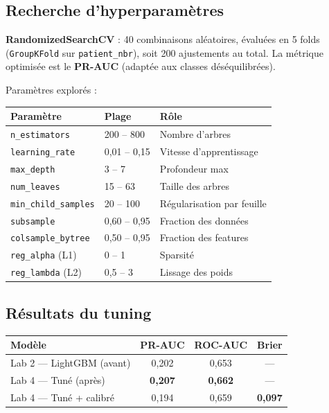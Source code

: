 \documentclass[11pt,a4paper]{article}
\begin{document}
\subsection{Recherche d'hyperparamètres}

\textbf{RandomizedSearchCV} : 40 combinaisons al\'eatoires, \'evalu\'ees en 5 folds (\texttt{GroupKFold} sur \texttt{patient\_nbr}), soit 200 ajustements au total. La m\'etrique optimis\'ee est le \textbf{PR-AUC} (adapt\'ee aux classes d\'es\'equilibr\'ees).

Param\`etres explor\'es :

\begin{center}
\small
\begin{tabular}{@{}lll@{}}
\toprule
\textbf{Param\`etre} & \textbf{Plage} & \textbf{R\^ole} \\
\midrule
\texttt{n\_estimators} & 200 -- 800 & Nombre d'arbres \\
\texttt{learning\_rate} & 0{,}01 -- 0{,}15 & Vitesse d'apprentissage \\
\texttt{max\_depth} & 3 -- 7 & Profondeur max \\
\texttt{num\_leaves} & 15 -- 63 & Taille des arbres \\
\texttt{min\_child\_samples} & 20 -- 100 & R\'egularisation par feuille \\
\texttt{subsample} & 0{,}60 -- 0{,}95 & Fraction des donn\'ees \\
\texttt{colsample\_bytree} & 0{,}50 -- 0{,}95 & Fraction des features \\
\texttt{reg\_alpha} (L1) & 0 -- 1 & Sparsit\'e \\
\texttt{reg\_lambda} (L2) & 0{,}5 -- 3 & Lissage des poids \\
\bottomrule
\end{tabular}
\end{center}

\subsection{R\'esultats du tuning}

\begin{center}
\begin{tabular}{@{}lccc@{}}
\toprule
\textbf{Mod\`ele} & \textbf{PR-AUC} & \textbf{ROC-AUC} & \textbf{Brier} \\
\midrule
Lab 2 --- LightGBM (avant) & 0{,}202 & 0{,}653 & --- \\
Lab 4 --- Tun\'e (apr\`es) & \textbf{0{,}207} & \textbf{0{,}662} & --- \\
Lab 4 --- Tun\'e + calibr\'e & 0{,}194 & 0{,}659 & \textbf{0{,}097} \\
\bottomrule
\end{tabular}
\end{center}
\end{document}
